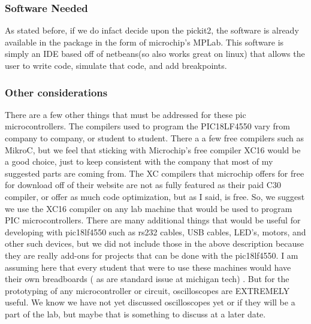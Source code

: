 \documentclass[12pt]{article}
\begin{document}
\subsubsection{Software Needed}
As stated before, if we do infact decide upon the pickit2, the software is already available in the
package in the form of microchip's MPLab.
This software is simply an IDE based off of netbeans(so also works great on linux) that allows the
user to write code, simulate that code, and add breakpoints.

\subsubsection{Other considerations}
There are a few other things that must be addressed for these pic microcontrollers. The compilers
used to program the PIC18LF4550 vary from company to company, or student to student. There a
a few free compilers such as MikroC, but we feel that sticking with Microchip's free compiler XC16
would be a good choice, just to keep consistent with the company that most of my suggested parts
are coming from. The XC compilers that microchip offers for free for download off of their website
are not as fully featured as their paid C30 compiler, or offer as much code optimization, but as I
said, is free. So, we suggest we use the XC16 compiler on any lab machine that would be used to
program PIC microcontrollers.
There are many additional things that would be useful for developing with pic18lf4550 such as
rs232 cables, USB cables, LED's, motors, and other such devices, but we did not include those
in the above description because they are really add-ons for projects that can be done with the
pic18lf4550.
I am assuming here that every student that were to use these machines would have their
own breadboards ( as are standard issue at michigan tech) . But for the prototyping of any
microcontroller or circuit, oscilloscopes are EXTREMELY useful. We know we have not yet
discussed oscilloscopes yet or if they will be a part of the lab, but maybe that is something to
discuss at a later date.
\end{document}
